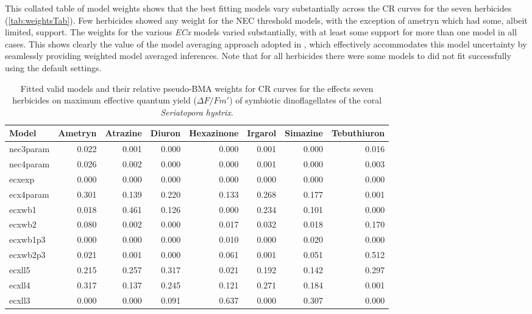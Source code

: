 \documentclass[
  shortnames]{jss}
\begin{document}
This collated table of model weights shows that the best fitting models vary substantially across the CR curves for the seven herbicides (\autoref{tab:weightsTab}). Few herbicides showed any weight for the NEC threshold models, with the exception of ametryn which had some, albeit limited, support. The weights for the various \emph{ECx} models varied substantially, with at least some support for more than one model in all cases. This shows clearly the value of the model averaging approach adopted in , which effectively accommodates this model uncertainty by seamlessly providing weighted model averaged inferences. Note that for all herbicides there were some models to did not fit successfully using the default  settings.

\begin{CodeChunk}
\begin{table}

\caption{\label{tab:weightsTab}Fitted valid models and their relative pseudo-BMA weights for CR curves for the effects seven herbicides on maximum effective quantum yield ($\Delta F / Fm'$) of symbiotic dinoflagellates of the coral \textit{Seriatopora hystrix}.}
\centering
\begin{tabular}[t]{l|r|r|r|r|r|r|r}
\hline
Model & Ametryn & Atrazine & Diuron & Hexazinone & Irgarol & Simazine & Tebuthiuron\\
\hline
nec3param & 0.022 & 0.001 & 0.000 & 0.000 & 0.001 & 0.000 & 0.016\\
\hline
nec4param & 0.026 & 0.002 & 0.000 & 0.000 & 0.001 & 0.000 & 0.003\\
\hline
ecxexp & 0.000 & 0.000 & 0.000 & 0.000 & 0.000 & 0.000 & 0.000\\
\hline
ecx4param & 0.301 & 0.139 & 0.220 & 0.133 & 0.268 & 0.177 & 0.001\\
\hline
ecxwb1 & 0.018 & 0.461 & 0.126 & 0.000 & 0.234 & 0.101 & 0.000\\
\hline
ecxwb2 & 0.080 & 0.002 & 0.000 & 0.017 & 0.032 & 0.018 & 0.170\\
\hline
ecxwb1p3 & 0.000 & 0.000 & 0.000 & 0.010 & 0.000 & 0.020 & 0.000\\
\hline
ecxwb2p3 & 0.021 & 0.001 & 0.000 & 0.061 & 0.001 & 0.051 & 0.512\\
\hline
ecxll5 & 0.215 & 0.257 & 0.317 & 0.021 & 0.192 & 0.142 & 0.297\\
\hline
ecxll4 & 0.317 & 0.137 & 0.245 & 0.121 & 0.271 & 0.184 & 0.001\\
\hline
ecxll3 & 0.000 & 0.000 & 0.091 & 0.637 & 0.000 & 0.307 & 0.000\\
\hline
\end{tabular}
\end{table}

\end{CodeChunk}
\end{document}
